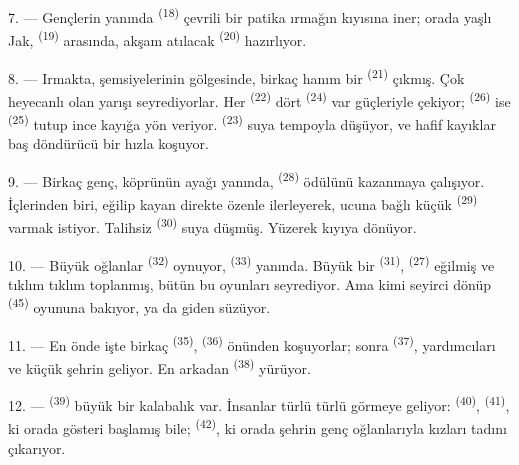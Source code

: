 7. --- Gençlerin yanında  \textsuperscript{(18)}
çevrili bir patika ırmağın kıyısına iner; orada yaşlı Jak,
 \textsuperscript{(19)} arasında, akşam atılacak
 \textsuperscript{(20)} hazırlıyor.

\VUsaut{4.4mm}
\VUsaut{3.4mm}

8. --- Irmakta, şemsiyelerinin gölgesinde, birkaç hanım bir 
\textsuperscript{(21)} çıkmış. Çok heyecanlı olan yarışı seyrediyorlar. Her
 \textsuperscript{(22)} dört 
\textsuperscript{(24)} var güçleriyle çekiyor; 
\textsuperscript{(26)} ise  \textsuperscript{(25)} tutup ince
kayığa yön veriyor.  \textsuperscript{(23)} suya tempoyla
düşüyor, ve hafif kayıklar baş döndürücü bir hızla koşuyor.

9. --- Birkaç genç, köprünün ayağı yanında, 
\textsuperscript{(28)} ödülünü kazanmaya çalışıyor. İçlerinden biri, eğilip
kayan direkte özenle ilerleyerek, ucuna bağlı küçük 
\textsuperscript{(29)} varmak istiyor. Talihsiz 
\textsuperscript{(30)} suya düşmüş. Yüzerek kıyıya dönüyor.

10. --- Büyük oğlanlar  \textsuperscript{(32)} oynuyor,
 \textsuperscript{(33)} yanında. Büyük bir
 \textsuperscript{(31)}, 
\textsuperscript{(27)}  eğilmiş ve  tıklım
tıklım toplanmış, bütün bu oyunları seyrediyor. Ama kimi seyirci dönüp 
\textsuperscript{(45)} oyununa bakıyor, ya da  giden
 süzüyor.

11. --- En önde işte birkaç  \textsuperscript{(35)},
 \textsuperscript{(36)} önünden koşuyorlar; sonra  \textsuperscript{(37)}, yardımcıları ve küçük şehrin  geliyor. En arkadan  \textsuperscript{(38)}
yürüyor.

\VUsaut{5.0mm}
\VUsaut{3.6mm}

12. ---  \textsuperscript{(39)} büyük bir kalabalık
var. İnsanlar türlü türlü  görmeye geliyor:
 \textsuperscript{(40)}, 
\textsuperscript{(41)}, ki orada gösteri başlamış bile; 
\textsuperscript{(42)}, ki orada şehrin genç oğlanlarıyla kızları
 tadını çıkarıyor.

